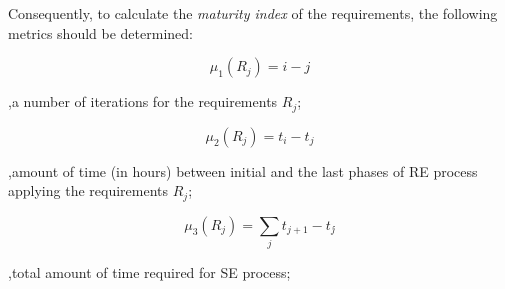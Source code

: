 Consequently, to calculate the \textit{maturity index} of the requirements, the following metrics should be determined:

 \begin{equation}\label{eqn:mu1}
\mu_{1}(R_{j}) = i-j
	\end{equation}
	
,\textrm{a number of iterations for the requirements} $R_{j}$;

 \begin{equation}\label{eqn:mu2}
\mu_{2}(R_{j}) = t_{i}-t_{j}    
 \end{equation}

,\textrm{amount of time (in hours) between initial and the last phases of RE process applying the requirements} $R_{j}$;

\begin{equation}\label{eqn:mu3}
\mu_{3}(R_{j}) = \displaystyle\sum_{j} t_{j+1}-t_{j}\acute{}
 \end{equation}

,\textrm{total amount of time required for SE process};


